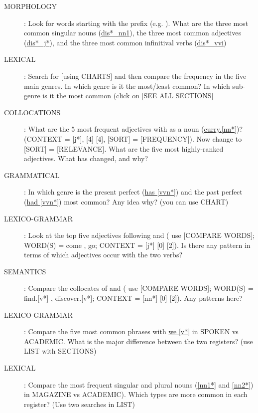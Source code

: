 \documentclass[a4paper,landscape,headrule,footrule,xetex]{foils}
\begin{document}
\begin{description}
\item [MORPHOLOGY]: Look for words starting with the prefix 
  (e.g. ).  What are the three most common singular nouns
  (\url{dis*_nn1}), the three most common adjectives (\url{dis*_j*}), and the
  three most common infinitival verbs (\url{dis*_vvi})

\item [LEXICAL]: Search for  [using CHARTS] and then
  compare the frequency in the five main genres.  In which genre is it
  the most/least common? In which sub-genre is it the most common
  (click on [SEE ALL SECTIONS]
\newpage

 \item [COLLOCATIONS]: What are the 5 most frequent adjectives with
    as a noun (\url{curry.[nn*]})? (CONTEXT = [j*], [4] [4], [SORT] =
   [FREQUENCY]). Now change to [SORT] = [RELEVANCE]. What are the five
   most highly-ranked adjectives. What has changed, and why?

\item[GRAMMATICAL]: In which genre is the present perfect (\url{has
    [vvn*]}) and the past perfect (\url{had [vvn*]}) most common? Any
  idea why? (you can use CHART)

\item[LEXICO-GRAMMAR]: Look at the top five adjectives following
   and  ( use [COMPARE WORDS]; WORD(S) = come , go;
  CONTEXT =  [j*] [0] [2]). Is there any pattern in terms of which
  adjectives occur with the two verbs?

\newpage
\item[SEMANTICS]: Compare the collocates of  and
   ( use [COMPARE WORDS]; WORD(S) = find.[v*] ,
  discover.[v*]; CONTEXT = [nn*] [0] [2]). Any patterns here?

\item[LEXICO-GRAMMAR]: Compare the five most common phrases with
  \url{we [v*]} in SPOKEN vs ACADEMIC.  What is the major difference
  between the two registers? (use LIST with SECTIONS)

\item[LEXICAL]: Compare the most frequent singular and plural nouns
  (\url{[nn1*]} and \url{[nn2*]}) in MAGAZINE vs ACADEMIC).  Which
  types are more common in each register? (Use two searches in LIST)
\end{description}
\end{document}
